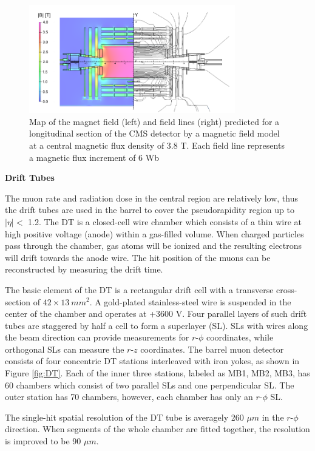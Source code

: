 \documentclass[thesis.tex]{subfiles}
\begin{document}
\begin{figure}[hbtp]
	\centering
	\includegraphics[width=0.8\textwidth]{plot/magnet.png}
	\caption{Map of the magnet field (left) and field lines (right) predicted for a longitudinal section of the CMS detector by a magnetic field model at a central magnetic flux density of 3.8 T. Each field line represents a magnetic flux increment of 6 Wb}
	\label{fig:magnet}
\end{figure}

\noindent \textbf{Drift Tubes} 

The muon rate and radiation dose in the central region are relatively low, thus the drift tubes are used in the barrel to cover the pseudorapidity region up to $|\eta| < $ 1.2.
The DT is a closed-cell wire chamber which consists of a thin wire at high positive voltage (anode) within a gas-filled volume.
When charged particles pass through the chamber, gas atoms will be ionized and the resulting electrons will drift towards the anode wire.
The hit position of the muons can be reconstructed by measuring the drift time.  

The basic element of the DT is a rectangular drift cell with a transverse cross-section of $42 \times 13\ mm^2$. 
A gold-plated stainless-steel wire is suspended in the center of the chamber and operates at +3600 V. 
Four parallel layers of such drift tubes are staggered by half a cell to form a superlayer (SL). 
SLs with wires along the beam direction can provide measurements for $r\text{-}\phi$ coordinates, while orthogonal SLs can measure the $r\text{-}z$ coordinates. 
The barrel muon detector consists of four concentric DT stations interleaved with iron yokes, as shown in Figure \ref{fig:DT}.
Each of the inner three stations, labeled as MB1, MB2, MB3, has 60 chambers which consist of two parallel SLs and one perpendicular SL. 
The outer station has 70 chambers, however, each chamber has only an $r\text{-}\phi$ SL. 

The single-hit spatial resolution of the DT tube is averagely 260 $\mu m$ in the $r\text{-}\phi$ direction.
When segments of the whole chamber are fitted together, the resolution is improved to be 90 $\mu m$.
\end{document}
